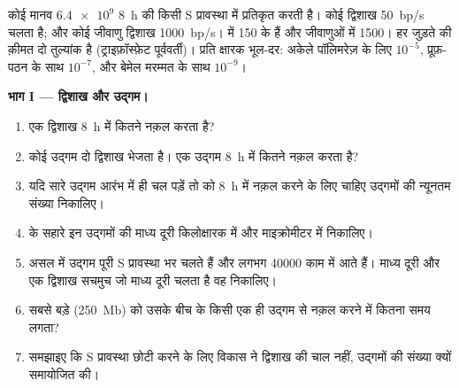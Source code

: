 \begin{problem}
\label{pb:b1:replication-mitosis:1}
कोई मानव  $\num{6.4e9}$  \qty{8}{h} की किसी S
प्रावस्था में प्रतिकृत करती है। कोई  द्विशाख \qty{50}{bp/s}
चलता है; और कोई जीवाणु द्विशाख \qty{1000}{bp/s}। 
 में \qty{150}{}  के हैं और जीवाणुओं में
\qty{1500}{}। हर जुड़ते  की क़ीमत दो  तुल्यांक है
(ट्राइफ़ॉस्फ़ेट पूर्ववर्ती)। प्रति क्षारक भूल-दर: अकेले पॉलिमरेज़ के लिए
$10^{-5}$, प्रूफ़-पठन के साथ $10^{-7}$, और बेमेल मरम्मत के साथ $10^{-9}$।

\medskip
\noindent\textbf{भाग I --- द्विशाख और उद्गम।}
\begin{enumerate}
  \item एक द्विशाख \qty{8}{h} में कितने  नक़ल करता है?
  \item कोई उद्गम दो द्विशाख भेजता है। एक उद्गम \qty{8}{h} में कितने
         नक़ल करता है?
  \item यदि सारे उद्गम आरंभ में ही चल पड़ें तो  को \qty{8}{h} में
        नक़ल करने के लिए चाहिए उद्गमों की न्यूनतम संख्या निकालिए।
  \item {} के सहारे इन उद्गमों की माध्य दूरी किलोक्षारक में और
        माइक्रोमीटर में निकालिए।
  \item असल में उद्गम पूरी S प्रावस्था भर चलते हैं और लगभग
        \num{40000} काम में आते हैं। माध्य दूरी और एक द्विशाख सचमुच जो
        माध्य दूरी चलता है वह निकालिए।
  \item सबसे बड़े  (\qty{250}{Mb}) को उसके बीच के किसी एक ही
        उद्गम से नक़ल करने में कितना समय लगता?
  \item समझाइए कि S प्रावस्था छोटी करने के लिए विकास ने द्विशाख की चाल
        नहीं, उद्गमों की संख्या क्यों समायोजित की।
\end{enumerate}


\end{problem}
